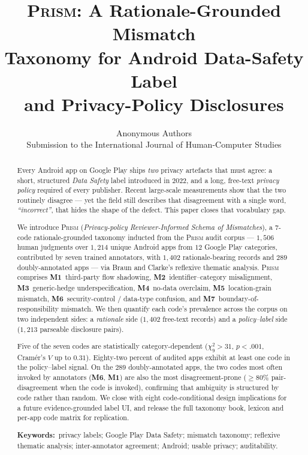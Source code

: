 \documentclass[11pt,a4paper]{article}
\title{\bfseries \textsc{Prism}: A Rationale-Grounded Mismatch \\[2pt]
Taxonomy for Android Data-Safety Label \\ and Privacy-Policy Disclosures}
\author{Anonymous Authors\\\small Submission to the International Journal of Human-Computer Studies}
\date{}
\newcommand{\prism}{\textsc{Prism}}
\newcommand{\code}[1]{\textsf{\textbf{#1}}}
\begin{document}
\maketitle

\begin{abstract}\noindent
Every Android app on Google Play ships \emph{two} privacy artefacts that
must agree: a short, structured \emph{Data Safety} label introduced in
$2022$, and a long, free-text \emph{privacy policy} required of every
publisher. Recent large-scale measurements show that the two routinely
disagree --- yet the field still describes that disagreement with a
single word, \emph{``incorrect''}, that hides the shape of the defect.
This paper closes that vocabulary gap.

We introduce \prism{} (\emph{Privacy-policy Reviewer-Informed Schema
of Mismatches}), a $7$-code rationale-grounded taxonomy inducted from
the \prism{} audit corpus --- $1{,}506$ human judgments over
$1{,}214$ unique Android apps from $12$ Google Play categories,
contributed by seven trained annotators, with $1{,}402$ rationale-bearing
records and $289$ doubly-annotated apps --- via Braun and Clarke's
reflexive thematic analysis. \prism{} comprises \code{M1}~third-party
flow shadowing, \code{M2}~identifier--category misalignment,
\code{M3}~generic-hedge underspecification, \code{M4}~no-data
overclaim, \code{M5}~location-grain mismatch,
\code{M6}~security-control / data-type confusion, and
\code{M7}~boundary-of-responsibility mismatch. We then quantify each code's prevalence
across the corpus on two independent sides: a \emph{rationale} side
($1{,}402$ free-text records) and a \emph{policy--label} side ($1{,}213$
parseable disclosure pairs).

Five of the seven codes are statistically category-dependent
($\chi^2_9 > 31$, $p<.001$, Cram\'er's $V$ up to $0.31$). Eighty-two
percent of audited apps exhibit at least one code in the policy--label
signal. On the $289$ doubly-annotated apps, the two codes most often
invoked by annotators (\code{M6}, \code{M1}) are also the most
disagreement-prone ($\geq 80\%$ pair-disagreement when the code is
invoked), confirming that ambiguity is structured by code rather than
random. We close with eight
code-conditional design implications for a future evidence-grounded
label UI, and release the full taxonomy book, lexicon and per-app code
matrix for replication.

\medskip\noindent\textbf{Keywords:}\ privacy labels; Google Play Data
Safety; mismatch taxonomy; reflexive thematic analysis;
inter-annotator agreement; Android; usable privacy; auditability.
\end{abstract}
\end{document}
